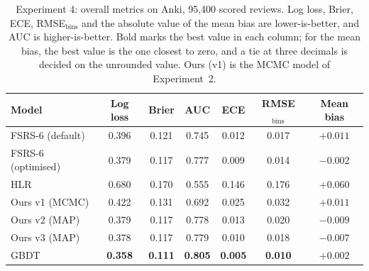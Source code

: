 \begin{table}[htbp]
  \centering
  \caption[Experiment 4: overall metrics on Anki]{Experiment 4: overall metrics on Anki, 95,400 scored reviews. Log loss, Brier, ECE,
    RMSE$_{\mathrm{bins}}$ and the absolute value of the mean bias are lower-is-better, and AUC is higher-is-better. Bold marks the best
    value in each column; for the mean bias, the best value is the one closest to zero, and a tie at three decimals is
    decided on the unrounded value. Ours (v1) is the MCMC model of Experiment~2.}
  \label{tab:exp4-anki}
  \begin{tabular}{@{}lcccccc@{}}
    \toprule
    Model & Log loss & Brier & AUC & ECE & RMSE$_{\mathrm{bins}}$ & Mean bias \\
    \midrule
    FSRS-6 (default) & 0.396 & 0.121 & 0.745 & 0.012 & 0.017 & $+0.011$ \\
    FSRS-6 (optimised) & 0.379 & 0.117 & 0.777 & 0.009 & 0.014 & $-0.002$ \\
    HLR & 0.680 & 0.170 & 0.555 & 0.146 & 0.176 & $+0.060$ \\
    Ours v1 (MCMC) & 0.422 & 0.131 & 0.692 & 0.025 & 0.032 & $+0.011$ \\
    Ours v2 (MAP) & 0.379 & 0.117 & 0.778 & 0.013 & 0.020 & $-0.009$ \\
    Ours v3 (MAP) & 0.378 & 0.117 & 0.779 & 0.010 & 0.018 & $-0.007$ \\
    GBDT & \textbf{0.358} & \textbf{0.111} & \textbf{0.805} & \textbf{0.005} & \textbf{0.010} & \textbf{$+0.002$} \\
    \bottomrule
  \end{tabular}
\end{table}

